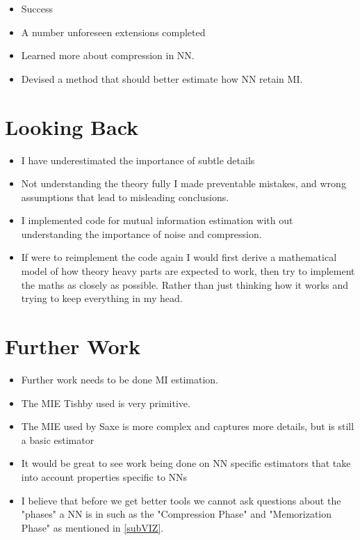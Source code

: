 \documentclass[dissertation.tex]{subfiles}
\begin{document}
\begin{itemize}
  \item{
      Success
    }
  \item{
      A number unforeseen extensions completed
    }
  \item{
      Learned more about compression in NN.
    }
  \item{
      Devised a method that should better estimate how NN retain MI.
    }
\end{itemize}

\section{Looking Back}
\begin{itemize}
  \item{
      I have underestimated the importance of subtle details
    }
  \item{
      Not understanding the theory fully I made preventable mistakes, and wrong
      assumptions that lead to misleading conclusions.
    }
  \item{
      I implemented code for mutual information estimation with out
      understanding the importance of noise and compression.
    }
  \item{
      If were to reimplement the code again I would first derive a mathematical
      model of how theory heavy parts are expected to work, then try to
      implement the maths as closely as possible. Rather than just thinking how
      it works and trying to keep everything in my head.
    }
\end{itemize}

\section{Further Work}
\begin{itemize}
  \item{
      Further work needs to be done MI estimation.
    }
  \item{
      The MIE Tishby used is very primitive. 
    }
  \item{
      The MIE used by Saxe is more complex and captures more details, but is
      still a basic estimator
    }
  \item{
      It would be great to see work being done on NN specific estimators that
      take into account properties specific to NNs
    }
  \item{
      I believe that before we get better tools we cannot ask questions about
      the "phases" a NN is in such as the "Compression Phase" and "Memorization
      Phase" as mentioned in \autoref{subVIZ}.
    }
\end{itemize}
\end{document}
